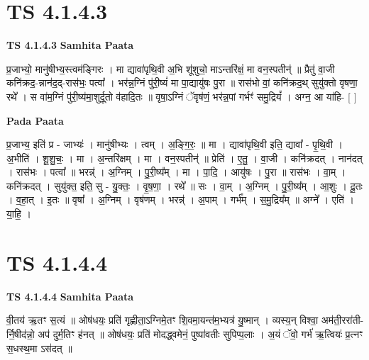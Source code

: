 \documentclass[17pt]{extarticle}
\begin{document}
\section*{ TS 4.1.4.3 }

\textbf{TS 4.1.4.3 } \newline
\textbf{Samhita Paata} \newline

प्र॒जाभ्यो॒ मानु॑षीभ्य॒स्त्वम॑ङ्गिरः । मा द्यावा॑पृथि॒वी अ॒भि शू॑शुचो॒ माऽन्तरि॑क्षं॒ मा वन॒स्पतीन्॑ ॥ प्रैतु॑ वा॒जी कनि॑क्रद॒-न्नान॑द॒द्-रास॑भः॒ पत्वा᳚ । भर॑न्न॒ग्निं पु॑री॒ष्यं॑ मा पा॒द्यायु॑षः पु॒रा ॥ रास॑भो वां॒ कनि॑क्रद॒थ् सुयु॑क्तो वृषणा॒ रथे᳚ । स वा॑म॒ग्निं पु॑री॒ष्य॑मा॒शुर्दू॒तो व॑हादि॒तः ॥ वृषा॒ऽग्निं ॅवृष॑णं॒ भर॑न्न॒पां गर्भꣳ॑ समु॒द्रियं᳚ । अग्न॒ आ या॑हि- [  ] \newline

\textbf{Pada Paata} \newline

प्र॒जाभ्य॒ इति॑ प्र - जाभ्यः॑ । मानु॑षीभ्यः । त्वम् । अ॒ङ्गि॒रः॒ ॥ मा । द्यावा॑पृथि॒वी इति॒ द्यावा᳚ - पृ॒थि॒वी । अ॒भीति॑ । शू॒शु॒चः॒ । मा । अ॒न्तरि॑क्षम् । मा । वन॒स्पतीन्॑ ॥ प्रेति॑ । ए॒तु॒ । वा॒जी । कनि॑क्रदत् । नान॑दत् । रास॑भः । पत्वा᳚ ॥ भरन्न्॑ । अ॒ग्निम् । पु॒री॒ष्य᳚म् । मा । पा॒दि॒ । आयु॑षः । पु॒रा ॥ रास॑भः । वा॒म् । कनि॑क्रदत् । सुयु॑क्त॒ इति॒ सु - यु॒क्तः॒ । वृ॒ष॒णा॒ । रथे᳚ ॥ सः । वा॒म् । अ॒ग्निम् । पु॒री॒ष्य᳚म् । आ॒शुः । दू॒तः । व॒हा॒त् । इ॒तः ॥ वृषा᳚ । अ॒ग्निम् । वृष॑णम् । भरन्न्॑ । अ॒पाम् । गर्भ᳚म् । स॒मु॒द्रिय᳚म् ॥ अग्ने᳚ । एति॑ । या॒हि॒ ।  \newline




\section*{ TS 4.1.4.4 }

\textbf{TS 4.1.4.4 } \newline
\textbf{Samhita Paata} \newline

वी॒तय॑ ऋ॒तꣳ स॒त्यं ॥ ओष॑धयः॒ प्रति॑ गृह्णीता॒ऽग्निमे॒तꣳ शि॒वमा॒यन्त॑म॒भ्यत्र॑ यु॒ष्मान् । व्यस्य॒न् विश्वा॒ अम॑ती॒ररा॑ती-र्नि॒षीद॑न्नो॒ अप॑ दुर्म॒तिꣳ ह॑नत् ॥ ओष॑धयः॒ प्रति॑ मोदद्ध्वमेनं॒ पुष्पा॑वतीः सुपिप्प॒लाः । अ॒यं ॅवो॒ गर्भ॑ ऋ॒त्वियः॑ प्र॒त्नꣳ स॒धस्थ॒मा ऽस॑दत् ॥ \newline
\end{document}
